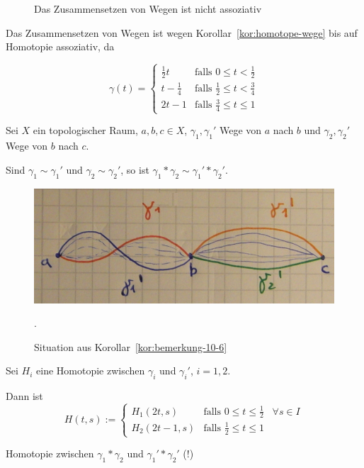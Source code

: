 \begin{beweis}
    \begin{figure}[ht]
        \centering

        \label{fig:assoziativitaet-von-wegen}
        \caption{Das Zusammensetzen von Wegen ist nicht assoziativ}
    \end{figure}

    Das Zusammensetzen von Wegen ist wegen Korollar~\ref{kor:homotope-wege}
    bis auf Homotopie assoziativ, da

    \[\gamma(t) = \begin{cases}
            \frac{1}{2} t   &\text{falls } 0 \leq t < \frac{1}{2}\\
            t - \frac{1}{4} &\text{falls } \frac{1}{2} \leq t < \frac{3}{4}\\
            2t - 1          &\text{falls } \frac{3}{4} \leq t \leq 1
        \end{cases}\]
\end{beweis}

\begin{korollar}\label{kor:bemerkung-10-6}
    Sei $X$ ein topologischer Raum, $a,b,c \in X$, $\gamma_1, \gamma_1'$
    Wege von $a$ nach $b$ und $\gamma_2, \gamma_2'$ Wege von $b$ nach $c$.

    Sind $\gamma_1 \sim \gamma_1'$ und $\gamma_2 \sim \gamma_2'$, so
    ist $\gamma_1 * \gamma_2 \sim \gamma_1 ' * \gamma_2'$.
\end{korollar}

\begin{figure}
    \centering
    \includegraphics[width=0.5\linewidth, keepaspectratio]{figures/todo/skizze-bemerkung-10-6.jpg}
    \caption{Situation aus Korollar~\ref{kor:bemerkung-10-6}}.
    \label{fig:situation-bemerkung-10-6}
\end{figure}

\begin{beweis}
    Sei $H_i$ eine Homotopie zwischen $\gamma_i$ und $\gamma_i'$,
    $i=1,2$.

    Dann ist 
    \[H(t,s) := \begin{cases}
        H_1(2t, s)  &\text{falls } 0 \leq t \leq \frac{1}{2}\;\;\;\forall s \in I\\
        H_2(2t-1,s) &\text{falls } \frac{1}{2} \leq t \leq 1
    \end{cases}\]

    Homotopie zwischen $\gamma_1 * \gamma_2$ und $\gamma_1' * \gamma_2 '$ (!)
\end{beweis}

